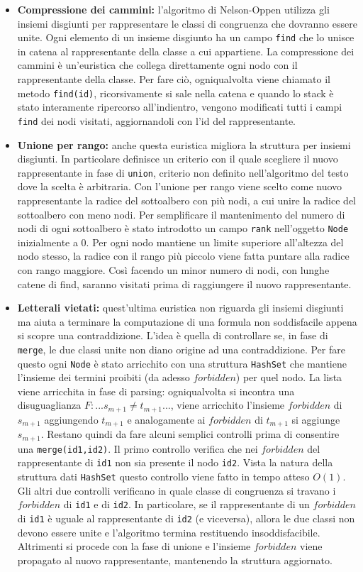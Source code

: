 \documentclass[a4paper,11pt]{article}
\begin{document}
\begin{itemize}
	\item {\bf Compressione dei cammini:} l'algoritmo di Nelson-Oppen utilizza gli insiemi disgiunti per rappresentare le classi di congruenza che dovranno essere unite. Ogni elemento di un insieme disgiunto ha un campo {\tt find} che lo unisce in catena al rappresentante della classe a cui appartiene.
La compressione dei cammini è un'euristica che collega direttamente ogni nodo con il rappresentante della classe.
Per fare ciò, ogniqualvolta viene chiamato il metodo {\tt find(id)}, ricorsivamente si sale nella catena e quando lo stack è stato interamente ripercorso all'indientro, vengono modificati tutti i campi {\tt find} dei nodi visitati, aggiornandoli con l'id del rappresentante.
	\item {\bf Unione per rango:} anche questa euristica migliora la struttura per insiemi disgiunti.
In particolare definisce un criterio con il quale scegliere il nuovo rappresentante in fase di {\tt union}, criterio non definito nell'algoritmo del testo dove la scelta è arbitraria.
Con l'unione per rango viene scelto come nuovo rappresentante la radice del sottoalbero con più nodi, a cui unire la radice del sottoalbero con meno nodi. Per semplificare il mantenimento del numero di nodi di ogni sottoalbero è stato introdotto un campo {\tt rank} nell'oggetto {\tt Node} inizialmente a 0.
Per ogni nodo mantiene un limite superiore all'altezza del nodo stesso, la radice con il rango più piccolo viene fatta puntare alla radice con rango maggiore.
Così facendo un minor numero di nodi, con lunghe catene di find, saranno visitati prima di raggiungere il nuovo rappresentante. 
	\item {\bf Letterali vietati:} quest'ultima euristica non riguarda gli insiemi disgiunti ma aiuta a terminare la computazione di una formula non soddisfacile appena si scopre una contraddizione.
L'idea è quella di controllare se, in fase di {\tt merge}, le due classi unite non diano origine ad una contraddizione.
Per fare questo ogni {\tt Node} è stato arricchito con una struttura {\tt HashSet} che mantiene l'insieme dei termini proibiti (da adesso $forbidden$) per quel nodo.
La lista viene arricchita in fase di parsing: ogniqualvolta si incontra una disuguaglianza
$F: ... s_{m+1} \not= t_{m+1} ... $, viene arricchito l'insieme $forbidden$ di $s_{m+1}$ aggiungendo $t_{m+1}$ e analogamente ai $forbidden$ di $t_{m+1}$ si aggiunge $s_{m+1}$.
Restano quindi da fare alcuni semplici controlli prima di consentire una {\tt merge(id1,id2)}.
Il primo controllo verifica che nei $forbidden$ del rappresentante di {\tt id1} non sia presente il nodo {\tt id2}.
Vista la natura della struttura dati {\tt HashSet} questo controllo viene fatto in tempo atteso $O(1)$.
Gli altri due controlli verificano in quale classe di congruenza si travano i $forbidden$ di {\tt id1} e di {\tt id2}.
In particolare, se il rappresentante di un $forbidden$ di {\tt id1} è uguale al rappresentante di {\tt id2} (e viceversa), allora le due classi non devono essere unite e l'algoritmo termina restituendo insoddisfacibile.
Altrimenti si procede con la fase di unione e l'insieme $forbidden$ viene propagato al nuovo rappresentante, mantenendo la struttura aggiornato.
\end{itemize}
\end{document}
